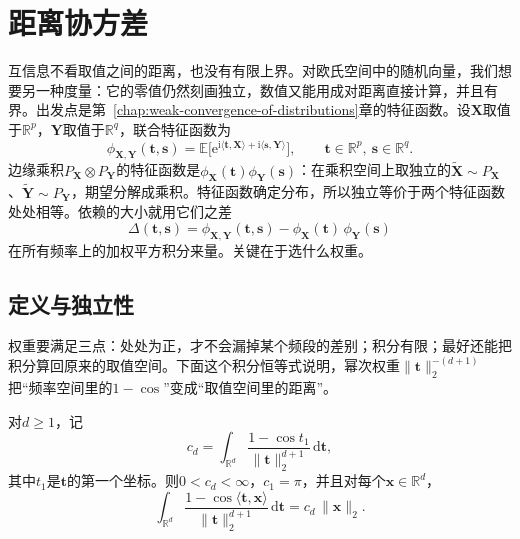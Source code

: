 \section{距离协方差}
\label{sec:dep-distance-covariance}

互信息不看取值之间的距离，也没有有限上界。对欧氏空间中的随机向量，我们想要另一种度量：它的零值仍然刻画独立，数值又能用成对距离直接计算，并且有界。出发点是第~\ref{chap:weak-convergence-of-distributions}章的特征函数。设$\bm{X}$取值于$\mathbb{R}^{p}$，$\bm{Y}$取值于$\mathbb{R}^{q}$，联合特征函数为
\[
  \phi_{\bm{X},\bm{Y}}(\bm{t},\bm{s})=\mathbb{E}\bigl[\mathrm{e}^{\mathrm{i}\langle\bm{t},\bm{X}\rangle+\mathrm{i}\langle\bm{s},\bm{Y}\rangle}\bigr],\qquad \bm{t}\in\mathbb{R}^{p},\ \bm{s}\in\mathbb{R}^{q}.
\]
边缘乘积$P_{\bm{X}}\otimes P_{\bm{Y}}$的特征函数是$\phi_{\bm{X}}(\bm{t})\phi_{\bm{Y}}(\bm{s})$：在乘积空间上取独立的$\tilde{\bm{X}}\sim P_{\bm{X}}$、$\tilde{\bm{Y}}\sim P_{\bm{Y}}$，期望分解成乘积。特征函数确定分布，所以独立等价于两个特征函数处处相等。依赖的大小就用它们之差
\[
  \Delta(\bm{t},\bm{s})=\phi_{\bm{X},\bm{Y}}(\bm{t},\bm{s})-\phi_{\bm{X}}(\bm{t})\,\phi_{\bm{Y}}(\bm{s})
\]
在所有频率上的加权平方积分来量。关键在于选什么权重。

\subsection{定义与独立性}
\label{sec:dep-dcov-definition}

权重要满足三点：处处为正，才不会漏掉某个频段的差别；积分有限；最好还能把积分算回原来的取值空间。下面这个积分恒等式说明，幂次权重$\lVert\bm{t}\rVert_2^{-(d+1)}$把“频率空间里的$1-\cos$”变成“取值空间里的距离”。

\begin{lemma}[余弦积分与距离]
\label{lem:dep-cos-integral}
对$d\geq1$，记
\begin{equation}
  c_d=\int_{\mathbb{R}^{d}}\frac{1-\cos t_1}{\lVert\bm{t}\rVert_2^{d+1}}\,\mathrm{d}\bm{t},
  \label{eq:dep-cd}
\end{equation}
其中$t_1$是$\bm{t}$的第一个坐标。则$0<c_d<\infty$，$c_1=\pi$，并且对每个$\bm{x}\in\mathbb{R}^{d}$，
\begin{equation}
  \int_{\mathbb{R}^{d}}\frac{1-\cos\langle\bm{t},\bm{x}\rangle}{\lVert\bm{t}\rVert_2^{d+1}}\,\mathrm{d}\bm{t}=c_d\,\lVert\bm{x}\rVert_2 .
  \label{eq:dep-cos-integral}
\end{equation}
\end{lemma}

